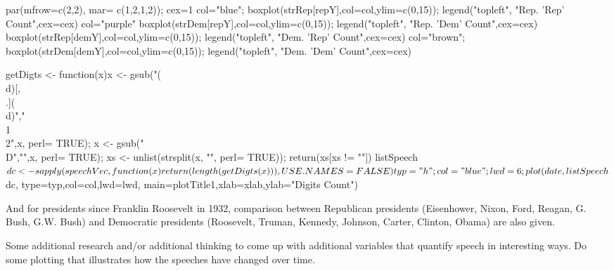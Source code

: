 \documentclass{article}
\begin{document}
par(mfrow=c(2,2), mar= c(1,2,1,2)); cex=1
col="blue";
boxplot(strRep[repY],col=col,ylim=c(0,15)); legend("topleft", "Rep. 'Rep' Count",cex=cex)
col="purple"
boxplot(strDem[repY],col=col,ylim=c(0,15)); legend("topleft", "Rep. 'Dem' Count",cex=cex)
boxplot(strRep[demY],col=col,ylim=c(0,15)); legend("topleft", "Dem. 'Rep' Count",cex=cex)
col="brown";
boxplot(strDem[demY],col=col,ylim=c(0,15)); legend("topleft", "Dem. 'Dem' Count",cex=cex)

getDigts <- function(x){x <- gsub("(\\d)[,\\.](\\d)","\\1\\2",x, perl= TRUE);
                        x <- gsub("\\D","\n",x, perl= TRUE);
                        xs <- unlist(strsplit(x, "\n", perl= TRUE));
                        return(xs[xs != ""])}
listSpeech$dc <- sapply(speechVec, function(x){return(length(getDigts(x)))}, USE.NAMES= FALSE)
typ="h"; col="blue"; lwd=6; 
plot(date,listSpeech$dc, type=typ,col=col,lwd=lwd, main=plotTitle1,xlab=xlab,ylab="Digits Count")






And for presidents since Franklin Roosevelt in 1932, comparison between Republican presidents 
(Eisenhower, Nixon, Ford, Reagan, G. Bush, G.W. Bush) and Democratic presidents 
(Roosevelt, Truman, Kennedy, Johnson, Carter, Clinton, Obama) are also given.









Some additional research and/or additional thinking to come up with additional
variables that quantify speech in interesting ways. Do some plotting that illustrates how the
speeches have changed over time.
\end{document}
